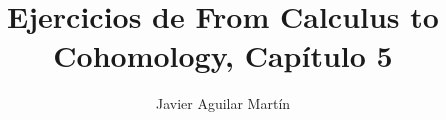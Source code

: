 \documentclass[twoside]{article}
\begin{document}
\title{Ejercicios de From Calculus to Cohomology, Capítulo 5}
\author{Javier Aguilar Martín}
\maketitle


\end{document}
